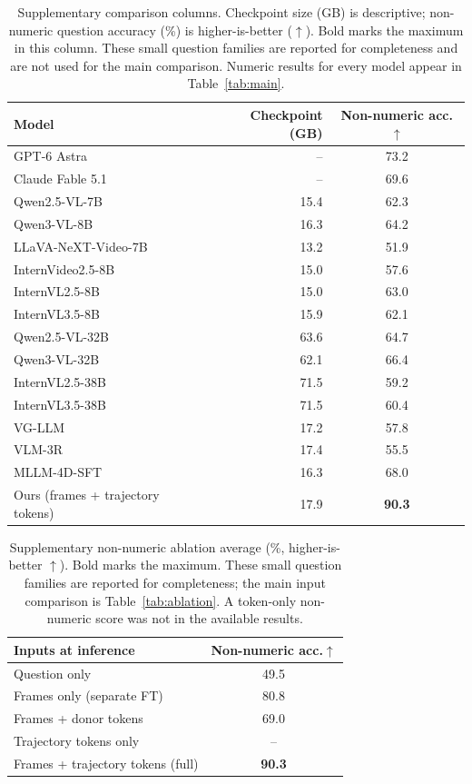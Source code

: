 \begin{table}[t]
\caption{Supplementary comparison columns. Checkpoint size (GB) is descriptive; non-numeric question accuracy (\%) is higher-is-better ($\uparrow$). Bold marks the maximum in this column. These small question families are reported for completeness and are not used for the main comparison. Numeric results for every model appear in Table~\ref{tab:main}.}
\label{tab:main-full}
\begin{center}
\small
\begin{tabular}{lrc}
\toprule
\textbf{Model} & \textbf{Checkpoint (GB)} & \textbf{Non-numeric acc.}$\uparrow$ \\
\midrule
GPT-6 Astra & -- & 73.2 \\
Claude Fable 5.1 & -- & 69.6 \\
Qwen2.5-VL-7B & 15.4 & 62.3 \\
Qwen3-VL-8B & 16.3 & 64.2 \\
LLaVA-NeXT-Video-7B & 13.2 & 51.9 \\
InternVideo2.5-8B & 15.0 & 57.6 \\
InternVL2.5-8B & 15.0 & 63.0 \\
InternVL3.5-8B & 15.9 & 62.1 \\
Qwen2.5-VL-32B & 63.6 & 64.7 \\
Qwen3-VL-32B & 62.1 & 66.4 \\
InternVL2.5-38B & 71.5 & 59.2 \\
InternVL3.5-38B & 71.5 & 60.4 \\
VG-LLM & 17.2 & 57.8 \\
VLM-3R & 17.4 & 55.5 \\
MLLM-4D-SFT & 16.3 & 68.0 \\
Ours (frames + trajectory tokens) & 17.9 & \textbf{90.3} \\
\bottomrule
\end{tabular}
\end{center}
\end{table}

\begin{table}[t]
\caption{Supplementary non-numeric ablation average (\%, higher-is-better $\uparrow$). Bold marks the maximum. These small question families are reported for completeness; the main input comparison is Table~\ref{tab:ablation}. A token-only non-numeric score was not in the available results.}
\label{tab:ablation-full}
\begin{center}
\small
\begin{tabular}{lc}
\toprule
\textbf{Inputs at inference} & \textbf{Non-numeric acc.}$\uparrow$ \\
\midrule
Question only & 49.5 \\
Frames only (separate FT) & 80.8 \\
Frames + donor tokens & 69.0 \\
Trajectory tokens only & -- \\
Frames + trajectory tokens (full) & \textbf{90.3} \\
\bottomrule
\end{tabular}
\end{center}
\end{table}

